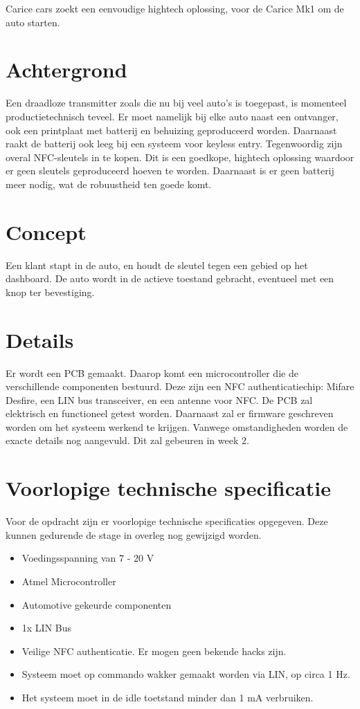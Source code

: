 Carice cars zoekt een eenvoudige hightech oplossing, voor de Carice Mk1 om de auto starten. \newline
\section{Achtergrond}
Een draadloze transmitter zoals die nu bij veel auto's is toegepast, is momenteel productietechnisch teveel. Er moet namelijk bij elke auto naast een ontvanger, ook een printplaat met batterij en behuizing geproduceerd worden. Daarnaast raakt de batterij ook leeg bij een systeem voor keyless entry. \newline
Tegenwoordig zijn overal NFC-sleutels in te kopen. Dit is een goedkope, hightech oplossing waardoor er geen sleutels geproduceerd hoeven te worden. 
Daarnaast is er geen batterij meer nodig, wat de robuustheid ten goede komt.

\section{Concept}
Een klant stapt in de auto, en houdt de sleutel tegen een gebied op het dashboard. De auto wordt in de actieve toestand gebracht, eventueel met een knop ter bevestiging.

\section{Details}
Er wordt een PCB gemaakt. Daarop komt een microcontroller die de verschillende componenten bestuurd. Deze zijn een NFC authenticatiechip: Mifare Desfire, een LIN bus transceiver, en een antenne voor NFC. 
De PCB zal elektrisch en functioneel getest worden.
Daarnaast zal er firmware geschreven worden om het systeem werkend te krijgen.
Vanwege omstandigheden worden de exacte details nog aangevuld. Dit zal gebeuren in week 2.

\section{Voorlopige technische specificatie}

Voor de opdracht zijn er voorlopige technische specificaties opgegeven. Deze kunnen gedurende de stage in overleg nog gewijzigd worden.


\begin{itemize}
	\item Voedingsspanning van 7 - 20 V
	\item Atmel Microcontroller
	\item Automotive gekeurde componenten
	\item 1x LIN Bus
	\item Veilige NFC authenticatie. Er mogen geen bekende hacks zijn.
	\item Systeem moet op commando wakker gemaakt worden via LIN, op circa 1 Hz.
	\item Het systeem moet in de idle toetstand minder dan 1 mA verbruiken.
\end{itemize}



